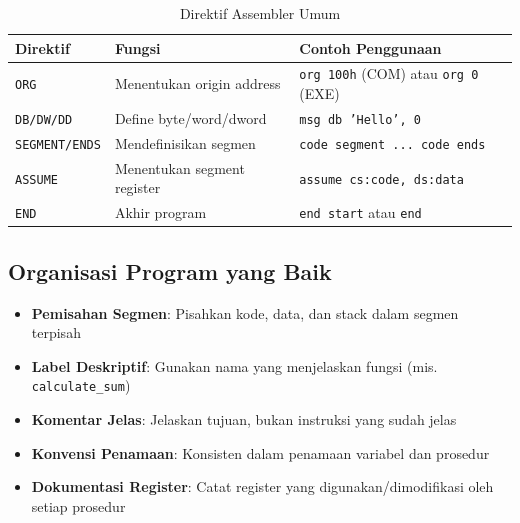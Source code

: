 \documentclass[../main.tex]{subfiles}
\begin{document}
\begin{table}[h]
\centering
\caption{Direktif Assembler Umum}
\begin{tabular}{|p{3cm}|p{4cm}|p{8cm}|}
\hline
\textbf{Direktif} & \textbf{Fungsi} & \textbf{Contoh Penggunaan} \\
\hline
\texttt{ORG} & Menentukan origin address & \texttt{org 100h} (COM) atau \texttt{org 0} (EXE) \\
\hline
\texttt{DB/DW/DD} & Define byte/word/dword & \texttt{msg db 'Hello', 0} \\
\hline
\texttt{SEGMENT/ENDS} & Mendefinisikan segmen & \texttt{code segment ... code ends} \\
\hline
\texttt{ASSUME} & Menentukan segment register & \texttt{assume cs:code, ds:data} \\
\hline
\texttt{END} & Akhir program & \texttt{end start} atau \texttt{end} \\
\hline
\end{tabular}
\label{tab:assembly-directives}
\end{table}

\subsection{Organisasi Program yang Baik}
\begin{itemize}
    \item \textbf{Pemisahan Segmen}: Pisahkan kode, data, dan stack dalam segmen terpisah
    \item \textbf{Label Deskriptif}: Gunakan nama yang menjelaskan fungsi (mis. \texttt{calculate\_sum})
    \item \textbf{Komentar Jelas}: Jelaskan tujuan, bukan instruksi yang sudah jelas
    \item \textbf{Konvensi Penamaan}: Konsisten dalam penamaan variabel dan prosedur
    \item \textbf{Dokumentasi Register}: Catat register yang digunakan/dimodifikasi oleh setiap prosedur
\end{itemize}
\end{document}
